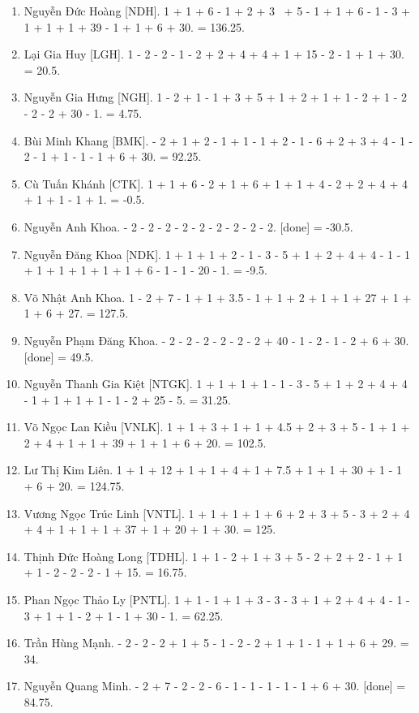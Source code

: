 \documentclass{article}
\begin{document}
\begin{enumerate}
	\item {\sc Nguyễn Đức Hoàng [NDH].} 1 + 1 + 6 - 1 + 2 + 3  + 5 - 1 + 1 + 6 - 1 - 3 + 1 + 1 + 1 + 39 - 1 + 1 + 6 + 30. = 136.25.
	\item {\sc Lại Gia Huy [LGH].} 1 - 2 - 2 - 1 - 2 + 2 + 4 + 4 + 1 + 15 - 2 - 1 + 1 + 30. = 20.5.
	\item {\sc Nguyễn Gia Hưng [NGH].} 1 - 2 + 1 - 1 + 3 + 5 + 1 + 2 + 1 + 1 - 2 + 1 - 2 - 2 - 2 + 30 - 1. = 4.75.
	\item {\sc Bùi Minh Khang [BMK].} - 2 + 1 + 2 - 1 + 1 - 1 + 2 - 1 - 6 + 2 + 3 + 4 - 1 - 2 - 1 + 1 - 1 - 1 + 6 + 30. = 92.25.
	\item {\sc Cù Tuấn Khánh [CTK].} 1 + 1 + 6 - 2 + 1 + 6 + 1 + 1 + 4 - 2 + 2 + 4 + 4 + 1 + 1 - 1 + 1. = -0.5.
	\item {\sc Nguyễn Anh Khoa.} - 2 - 2 - 2 - 2 - 2 - 2 - 2 - 2 - 2. [done] = -30.5.
	\item {\sc Nguyễn Đăng Khoa [NDK].} 1 + 1 + 1 + 2 - 1 - 3 - 5 + 1 + 2 + 4 + 4 - 1 - 1 + 1 + 1 + 1 + 1 + 1 + 6 - 1 - 1 - 20 - 1. = -9.5.
	\item {\sc Võ Nhật Anh Khoa.} 1 - 2 + 7 - 1 + 1 + 3.5 - 1 + 1 + 2 + 1 + 1 + 27 + 1 + 1 + 6 + 27. = 127.5.
	\item {\sc Nguyễn Phạm Đăng Khoa.} - 2 - 2 - 2 - 2 - 2 - 2 + 40 - 1 - 2 - 1 - 2 + 6 + 30. [done] = 49.5.
	\item {\sc Nguyễn Thanh Gia Kiệt [NTGK].} 1 + 1 + 1 + 1 - 1 - 3 - 5 + 1 + 2 + 4 + 4 - 1 + 1 + 1 + 1 - 1 - 2 + 25 - 5. = 31.25.
	\item {\sc Võ Ngọc Lan Kiều [VNLK].} 1 + 1 + 3 + 1 + 1 + 4.5 + 2 + 3 + 5 - 1 + 1 + 2 + 4 + 1 + 1 + 39 + 1 + 1 + 6 + 20. = 102.5.
	\item {\sc Lư Thị Kim Liên.} 1 + 1 + 12 + 1 + 1 + 4 + 1 + 7.5 + 1 + 1 + 30 + 1 - 1 + 6 + 20. = 124.75.
	\item {\sc Vương Ngọc Trúc Linh [VNTL].} 1 + 1 + 1 + 1 + 6 + 2 + 3 + 5 - 3 + 2 + 4 + 4 + 1 + 1 + 1 + 37 + 1 + 20 + 1 + 30. = 125.
	\item {\sc Thịnh Đức Hoàng Long [TDHL].} 1 + 1 - 2 + 1 + 3 + 5 - 2 + 2 + 2 - 1 + 1 + 1 - 2 - 2 - 2 - 1 + 15. = 16.75.
	\item {\sc Phan Ngọc Thảo Ly [PNTL].} 1 + 1 - 1 + 1 + 3 - 3 - 3 + 1 + 2 + 4 + 4 - 1 - 3 + 1 + 1 - 2 + 1 - 1 + 30 - 1. = 62.25.
	\item {\sc Trần Hùng Mạnh.} - 2 - 2 - 2 + 1 + 5 - 1 - 2 - 2 + 1 + 1 - 1 + 1 + 6 + 29. = 34.
	\item {\sc Nguyễn Quang Minh.} - 2 + 7 - 2 - 2 - 6 - 1 - 1 - 1 - 1 - 1 + 6 + 30. [done] = 84.75.

\end{enumerate}
\end{document}
